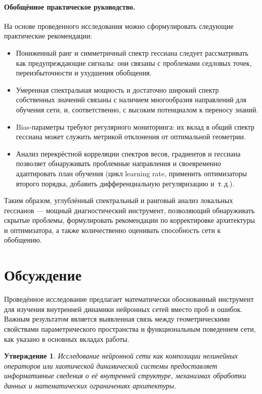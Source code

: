 \documentclass[a4paper,12pt]{article}
\newtheorem{proposition}{Утверждение}
\begin{document}
\paragraph{Обобщённое практическое руководство.}
На основе проведенного исследования можно сформулировать следующие практические рекомендации:
\begin{itemize}
  \item Пониженный ранг и симметричный спектр гессиана следует рассматривать как предупреждающие сигналы:
    они связаны с проблемами седловых точек, переизбыточности и ухудшения обобщения.
  \item Умеренная спектральная мощность и достаточно широкий спектр собственных значений связаны с
    наличием многообразия направлений для обучения сети, и, соответственно, с высоким потенциалом к переносу знаний.
  \item Bias-параметры требуют регулярного мониторинга: их вклад в общий спектр гессиана может служить
    метрикой отклонения от оптимальной геометрии.
  \item Анализ перекрёстной корреляции спектров весов, градиентов и гессиана позволяет обнаруживать
    проблемные направления
    и своевременно адаптировать план обучения (цикл learning rate, применить оптимизаторы
    второго порядка, добавить дифференциальную регуляризацию и~т.\,д.).
\end{itemize}

Таким образом, углублённый спектральный и ранговый анализ локальных гессианов — мощный диагностический
инструмент, позволяющий обнаруживать скрытые проблемы, формулировать рекомендации по корректировке
архитектуры и оптимизатора, а также количественно оценивать способность сети к обобщению.

\section{Обсуждение}
Проведённое исследование предлагает математически обоснованный инструмент для изучения внутренней динамики
нейронных сетей вместо проб и ошибок. Важным результатом является выявленная связь между геометрическими свойствами
параметрического пространства и функциональным поведением сети, как указано в основных вкладах работы.

\begin{proposition}
  Исследование нейронной сети как композиции нелинейных операторов или хаотической динамической системы
  предоставляет информативные сведения о её внутренней структуре, механизмах обработки данных и
  математических ограничениях архитектуры.
\end{proposition}
\end{document}
